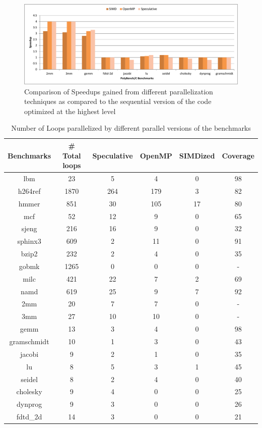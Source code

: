 \documentclass[10pt]{report}          %
\begin{document}
\begin{figure}
\centering
\includegraphics[scale=0.56]{./pdf/poly_O5.pdf}
\caption{Comparison of Speedups gained from different parallelization techniques as compared to the sequential version of the code optimized at the highest level }
\label{fig:poly_O5}
\end{figure}

\begin{table}
\centering
\caption{Number of Loops parallelized by different parallel versions of the benchmarks}
\begin{tabular}{|c||c|c|c|c|c|} \hline
Benchmarks & \# Total loops & Speculative & OpenMP & SIMDized & Coverage \\ \hline
lbm & 23 & 5 & 4  &	0 & 98\\ \hline
h264ref & 1870 & 264 & 179 & 3 & 82 \\ \hline
hmmer &	 851	 & 30 & 105 & 17 & 80 \\ \hline
mcf & 52 & 12 & 9 & 0 & 65 \\ \hline
sjeng &	216 & 16	 & 9 & 0 & 32 \\ \hline
sphinx3 & 609 & 2 & 11 & 0 & 91 \\ \hline
bzip2 & 232 & 2 & 4 & 0 & 35 \\ \hline
gobmk & 1265 & 0 & 0 & 0 & - \\ \hline
milc & 421 & 22 & 7 & 2 & 69 \\ \hline
namd & 619 & 25 & 9 & 7 & 92 \\ \hline	
2mm	&20& 7 &7 & 0 & - \\ \hline
3mm	&27& 10&10 & 0 & - \\ \hline	
gemm & 13 & 3 & 4 & 0 & 98 \\ \hline
gramschmidt & 10 & 1 & 3 & 0 & 43 \\ \hline
jacobi & 9 & 2 & 1 & 0 & 35 \\ \hline
lu & 8 & 5 & 3 & 1 & 45 \\ \hline
seidel & 8 & 2 & 4 & 0 & 40 \\ \hline	
cholesky & 9 & 4 & 0 & 0 & 25 \\ \hline
dynprog & 9 & 3 & 0 & 0 & 26 \\ \hline
fdtd\_2d & 14 & 3 & 0 & 0 & 21 \\ \hline
\hline\end{tabular}
\label{table:coverage_2}
\end{table}
\end{document}
